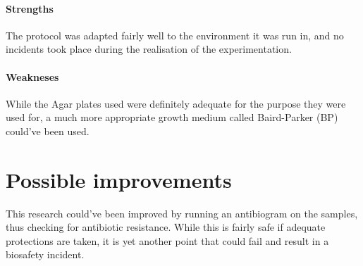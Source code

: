 \paragraph{Strengths} The protocol was adapted fairly well to the environment it was run in, and no incidents took place during the realisation of the experimentation.
\paragraph{Weakneses} While the Agar plates used were definitely adequate for the purpose they were used for, a much more appropriate growth medium called Baird-Parker (BP) could've been used.
\section{Possible improvements}
This research could've been improved by running an antibiogram on the samples, thus checking for antibiotic resistance. While this is fairly safe if adequate protections are taken, it is yet another point that could fail and result in a biosafety incident.